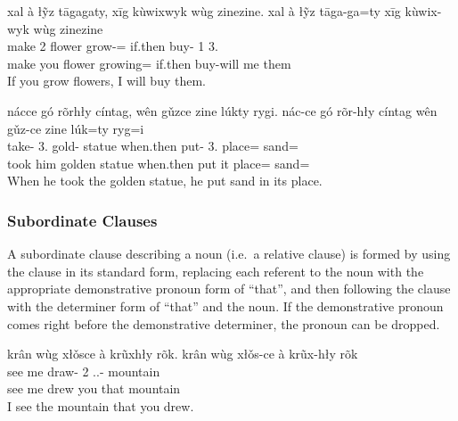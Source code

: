 \documentclass[12pt]{article}
\begin{document}
    \begin{exe}
        \ex
        \glt
        xal à łỹz tāgagaty, xīg kùwixwyk wùg zinezine.
        \glll
        xal à łỹz tāga-ga=ty xīg kùwix-wyk wùg zinezine \\
        make 2\Sg{} flower grow-\Ger{}=\Poss{} if.then buy-\Fut{} 1\Sg{} 3\Pl{}.\Inanim{} \\
        make you flower growing=\Poss{} if.then buy-will me them \\
        \glt
        If you grow flowers, I will buy them.
    \end{exe}

    \begin{exe}
        \ex
        \glt
        nácce gó rõrhły cíntag, wên gǔzce zine lúkty rygi.
        \glll
        nác-ce gó rõr-hły cíntag wên gǔz-ce zine lúk=ty ryg=i \\
        take-\Pst{} 3\Sg{}.\Anim{} gold-\Adj{} statue when.then put-\Pst{} 3\Sg{}.\Inanim{} place=\Poss{} sand=\IllThree{} \\
        took him golden statue when.then put it place=\Poss{} sand=\IllThree{} \\
        \glt
        When he took the golden statue, he put sand in its place.
    \end{exe}

    \subsubsection*{Subordinate Clauses}

    A subordinate clause describing a noun (i.e.\ a relative clause)
    is formed by using the clause in its standard form,
    replacing each referent to the noun with
    the appropriate demonstrative pronoun form of ``that'',
    and then following the clause with
    the determiner form of ``that'' and the noun.
    If the demonstrative pronoun comes right before
    the demonstrative determiner, the pronoun can be dropped.

    \begin{exe}
        \ex
        \glt
        krân wùg xłǒsce à krũxhły rõk.
        \glll
        krân wùg xłǒs-ce à krũx-hły rõk \\
        see me draw-\Pst{} 2\Sg{} \Dem{}.\Dist{}.\Inanim{}-\Adj{} mountain \\
        see me drew you that mountain \\
        \glt
        I see the mountain that you drew.
    \end{exe}
\end{document}
